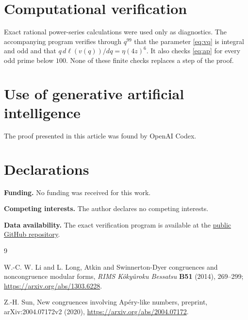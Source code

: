 \documentclass[11pt]{article}
\theoremstyle{remark}
\begin{document}
\section*{Computational verification}

Exact rational power-series calculations were used only as diagnostics.
The accompanying program verifies through $q^{99}$ that the parameter
\eqref{eq:vq} is integral and odd and that
$q\,d\ell(v(q))/dq=\eta(4z)^6$.  It also checks \eqref{eq:ap} for every
odd prime below $100$.  None of these finite checks replaces a step of the
proof.

\section*{Use of generative artificial intelligence}

The proof presented in this article was found by OpenAI Codex.

\section*{Declarations}

\noindent\textbf{Funding.} No funding was received for this work.

\noindent\textbf{Competing interests.} The author declares no competing
interests.

\noindent\textbf{Data availability.} The exact verification program is
available at the
\href{https://github.com/huiminZheng-collab/sun-conjecture-2-7-proof-candidate}
{public GitHub repository}.

\begin{thebibliography}{9}

W.-C. W. Li and L. Long,
Atkin and Swinnerton-Dyer congruences and noncongruence modular forms,
\emph{RIMS K\^oky\^uroku Bessatsu} \textbf{B51} (2014), 269--299;
\url{https://arxiv.org/abs/1303.6228}.

Z.-H. Sun,
New congruences involving Ap\'ery-like numbers,
preprint, arXiv:2004.07172v2 (2020),
\url{https://arxiv.org/abs/2004.07172}.

\end{thebibliography}
\end{document}
